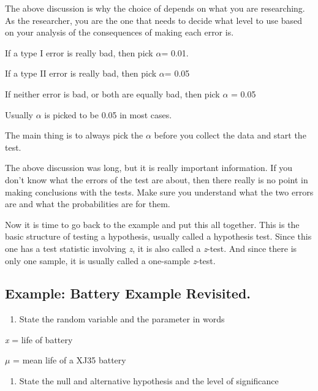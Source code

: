 \documentclass[]{book}
\providecommand{\tightlist}{%
  \setlength{\itemsep}{0pt}\setlength{\parskip}{0pt}}
\begin{document}
The above discussion is why the choice of depends on what you are researching. As the researcher, you are the one that needs to decide what level to use based on your analysis of the consequences of making each error is.

If a type I error is really bad, then pick \(\alpha\)= 0.01.

If a type II error is really bad, then pick \(\alpha\)= 0.05

If neither error is bad, or both are equally bad, then pick \(\alpha\) = 0.05

Usually \(\alpha\) is picked to be 0.05 in most cases.

The main thing is to always pick the \(\alpha\) before you collect the data and start the test.

The above discussion was long, but it is really important information. If you don't know what the errors of the test are about, then there really is no point in making conclusions with the tests. Make sure you understand what the two errors are and what the probabilities are for them.

Now it is time to go back to the example and put this all together. This is the basic structure of testing a hypothesis, usually called a hypothesis test. Since this one has a test statistic involving \emph{z}, it is also called a \emph{z}-test. And since there is only one sample, it is usually called a one-sample \emph{z}-test.

\hypertarget{example-battery-example-revisited.}{%
\subsection{Example: Battery Example Revisited.}\label{example-battery-example-revisited.}}

\begin{enumerate}
\def\labelenumi{\arabic{enumi}.}
\tightlist
\item
  State the random variable and the parameter in words
\end{enumerate}

\emph{x} = life of battery

\(\mu\) = mean life of a XJ35 battery

\begin{enumerate}
\def\labelenumi{\arabic{enumi}.}
\setcounter{enumi}{1}
\tightlist
\item
  State the null and alternative hypothesis and the level of significance
\end{enumerate}
\end{document}
